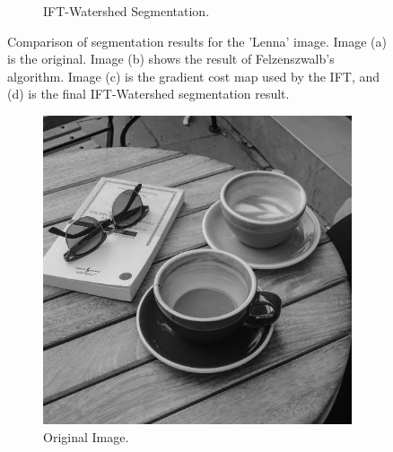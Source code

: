 \documentclass{sbc2023}
\begin{document}
\begin{figure}[H]
\begin{subfigure}[b]{0.15\textwidth}
            \caption{IFT-Watershed Segmentation.}
            \label{fig:lenna_ift_exp} %
        \end{subfigure}
    \caption{Comparison of segmentation results for the 'Lenna' image. Image (a) is the original. Image (b) shows the result of Felzenszwalb's algorithm. Image (c) is the gradient cost map used by the IFT, and (d) is the final IFT-Watershed segmentation result.}
    \label{fig:segmentation_comparison_lenna} %
    \end{figure}

    \begin{figure}[H]
    \centering
        \begin{subfigure}[b]{0.16\textwidth}
            \includegraphics[width=\textwidth]{imgs/coffe-tableGray.png}
            \caption{Original Image.}
            \label{fig:coffe_original}
        \end{subfigure}
    \hfill
        \begin{subfigure}[b]{0.15\textwidth}

\end{subfigure}
\end{figure}
\end{document}
